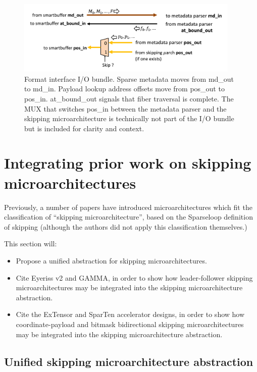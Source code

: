 \begin{figure}[ht]
    \centering
    \includegraphics[width=0.95\textwidth]{figures/format_interface.png}
    \caption{Format interface I/O bundle. Sparse metadata moves from md\_out to md\_in. Payload lookup address offsets move from pos\_out to pos\_in. at\_bound\_out signals that fiber traversal is complete. The MUX that switches pos\_in between the metadata parser and the skipping microarchitecture is technically not part of the I/O bundle but is included for clarity and context.}
    \label{fig:format_interface}
\end{figure}

\section{Integrating prior work on skipping microarchitectures}

Previously, a number of papers have introduced microarchitectures which fit the classification of ``skipping microarchitecture'', based on the Sparseloop\cite{sparseloop} definition of skipping (although the authors did not apply this classification themselves.)

This section will:

\begin{itemize}
    \item Propose a unified abstraction for skipping microarchitectures.
    \item Cite Eyeriss v2\cite{eyerissv2} and GAMMA\cite{gamma}, in order to show how leader-follower\cite{sparseloop} skipping microarchitectures may be integrated into the skipping microarchitecture abstraction.
    \item Cite the ExTensor\cite{extensor} and SparTen\cite{sparten} accelerator designs, in order to show how coordinate-payload and bitmask bidirectional skipping microarchitectures may be integrated into the skipping microarchitecture abstraction.
\end{itemize}

\subsection{Unified skipping microarchitecture abstraction}
\label{sec:unified_skipping_abstraction}

